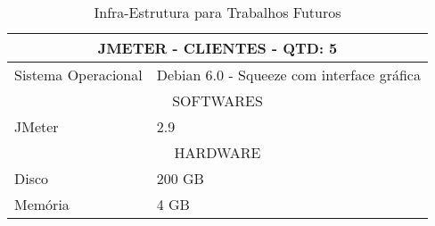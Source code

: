 \begin{table}[h]
	\caption{Infra-Estrutura para Trabalhos Futuros}
	\begin{center}
	\begin{tabular} {|l|l|}
		\hline
			\multicolumn{2}{|c|}{JMETER - CLIENTES - QTD: 5} \\
		\hline
			Sistema Operacional & Debian 6.0 - Squeeze com interface gráfica \\
		\hline
			\multicolumn{2}{|c|}{SOFTWARES}\\
		\hline
			JMeter & 2.9\\
		\hline
			\multicolumn{2}{|c|}{HARDWARE}\\
		\hline
			Disco & 200 GB\\
		\hline
			Memória & 4 GB\\
		\hline
	\end {tabular}
	\end{center}
	\label{tab:infra3}
\end{table}


